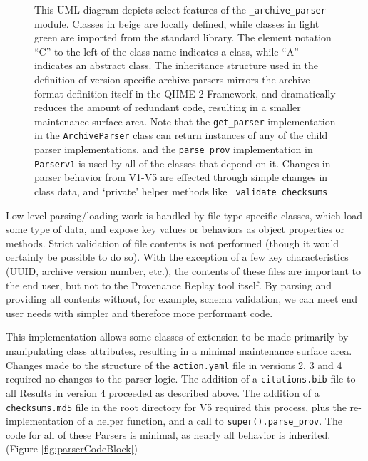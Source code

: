 \begin{figure}[htp]
\begin{minipage}[c]{0.5\textwidth}
    \end{minipage}\hfill
    \begin{minipage}[c]{0.45\textwidth}
\caption[UML Class diagram of the Version-specific Archive Parsers]%
{This UML diagram depicts select features of the \texttt{\_archive\_parser} module. Classes
in beige are locally defined, while classes in light green are imported from the
standard library. The element notation “C” to the left of the class name
indicates a class, while “A” indicates an abstract class. The inheritance
structure used in the definition of version-specific archive parsers mirrors the
archive format definition itself in the QIIME 2 Framework, and dramatically
reduces the amount of redundant code, resulting in a smaller maintenance surface
area. Note that the \texttt{get\_parser} implementation in the \texttt{ArchiveParser} class can
return instances of any of the child parser implementations, and the \texttt{parse\_prov}
implementation in \texttt{Parserv1} is used by all of the classes that depend on it.
Changes in parser behavior from V1-V5 are effected through simple changes in
class data, and ‘private’ helper methods like \texttt{\_validate\_checksums}}
    \end{minipage}
    \label{fig:archiveParsersUML}
\end{figure}

Low-level parsing/loading work is handled by file-type-specific classes, which
load some type of data, and expose key values or behaviors as object properties
or methods. Strict validation of file contents is not performed (though it would
certainly be possible to do so). With the exception of a few key characteristics
(UUID, archive version number, etc.), the contents of these files are important
to the end user, but not to the Provenance Replay tool itself. By parsing and
providing all contents without, for example, schema validation, we can meet end
user needs with simpler and therefore more performant code.

This implementation allows some classes of extension to be made primarily by
manipulating class attributes, resulting in a minimal maintenance surface area.
Changes made to the structure of the \texttt{action.yaml} file in versions 2, 3 and 4
required no changes to the parser logic. The addition of a \texttt{citations.bib} file to
all Results in version 4 proceeded as described above. The addition of a
\texttt{checksums.md5} file in the root directory for V5 required this process, plus the
re-implementation of a helper function, and a call to \texttt{super().parse\_prov}. The
code for all of these Parsers is minimal, as nearly all behavior is inherited. 
(Figure \ref{fig:parserCodeBlock})

